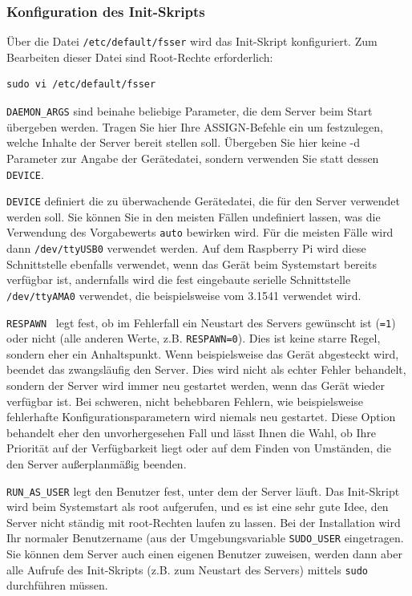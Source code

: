 \documentclass[10pt,a4paper]{scrartcl}		%
\begin{document}
\subsubsection*{Konfiguration des Init-Skripts}
Über die Datei \texttt{/etc/default/fsser} wird das Init-Skript
konfiguriert. Zum Bearbeiten dieser Datei sind Root-Rechte erforderlich:

\begin{verbatim}
sudo vi /etc/default/fsser
\end{verbatim}

\texttt{DAEMON\_ARGS}  sind beinahe beliebige Parameter,
die dem Server beim Start übergeben werden.
Tragen Sie hier Ihre ASSIGN-Befehle ein um festzulegen, welche Inhalte der
Server bereit stellen soll.
Übergeben Sie hier keine -d Parameter zur Angabe der Gerätedatei,
sondern verwenden Sie statt dessen \texttt{DEVICE}.

\texttt{DEVICE}  definiert die zu überwachende Gerätedatei, die für den
Server verwendet werden soll. Sie können Sie in den meisten Fällen undefiniert
lassen, was die Verwendung des Vorgabewerts \texttt{auto} bewirken wird.
Für die meisten Fälle wird dann \texttt{/dev/ttyUSB0} verwendet werden.
Auf dem Raspberry Pi wird diese Schnittstelle ebenfalls verwendet, wenn das
Gerät beim Systemstart bereits verfügbar ist, andernfalls wird die
fest eingebaute serielle Schnittstelle \texttt{/dev/ttyAMA0} verwendet, die
beispielsweise vom 3.1541 verwendet wird.

\texttt{RESPAWN}\  legt fest, ob im Fehlerfall ein Neustart des Servers
gewünscht ist (\texttt{=1}) oder nicht (alle anderen Werte,
z.B. \texttt{RESPAWN=0}). Dies ist keine starre Regel, sondern eher ein
Anhaltspunkt. Wenn beispielsweise das Gerät abgesteckt wird, beendet das
zwangsläufig den Server. Dies wird nicht als echter Fehler behandelt,
sondern der Server wird immer neu gestartet werden, wenn das Gerät wieder
verfügbar ist. Bei schweren, nicht behebbaren Fehlern, wie beispielsweise
fehlerhafte Konfigurationsparametern wird niemals neu gestartet.
Diese Option behandelt eher den unvorhergesehen Fall und lässt Ihnen die
Wahl, ob Ihre Priorität auf der Verfügbarkeit liegt oder auf dem Finden
von Umständen, die den Server außerplanmäßig beenden.

\texttt{RUN\_AS\_USER}  legt den Benutzer fest,
unter dem der Server läuft.
Das Init-Skript wird beim Systemstart als root aufgerufen, und es ist
eine sehr gute Idee, den Server nicht ständig mit root-Rechten laufen zu lassen.
Bei der Installation wird Ihr normaler Benutzername (aus der
Umgebungsvariable \texttt{SUDO\_USER} eingetragen. Sie können dem Server
auch einen eigenen Benutzer zuweisen, werden dann aber alle Aufrufe des
Init-Skripts (z.B. zum Neustart des Servers) mittels \texttt{sudo}
durchführen müssen.
\end{document}
